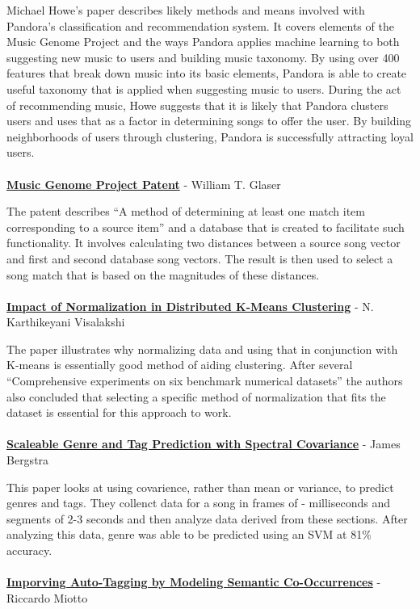 \documentclass[12pt]{article}
\begin{document}
Michael Howe's paper describes likely methods and means involved with Pandora's classification and recommendation system. It covers elements of the Music Genome Project and the ways Pandora applies machine learning to both suggesting new music to users and building music taxonomy. By using over 400 features that break down music into its basic elements, Pandora is able to create useful taxonomy that is applied when suggesting music to users. During the act of recommending music, Howe suggests that it is likely that Pandora clusters users and uses that as a factor in determining songs to offer the user. By building neighborhoods of users through clustering, Pandora is successfully attracting loyal users.
\\
\\
\href{http://www.google.com/patents/US7003515?dq=7,003,515}{\textbf{Music Genome Project Patent}} - William T. Glaser 

The patent describes  ``A method of determining at least one match item corresponding to a source item'' and a database that is created to facilitate such functionality. It involves calculating two distances between a source song vector and  first and second database song vectors. The result is then used to select a song match that is based on the magnitudes of these distances.
\\
\\
\href{http://www.medwelljournals.com/fulltext/?doi=ijscomp.2009.168.172}{\textbf{Impact of Normalization in Distributed K-Means Clustering}} - N. Karthikeyani Visalakshi 

The paper illustrates why normalizing data and using that in conjunction with K-means is essentially good method of aiding clustering. After several ``Comprehensive experiments on six benchmark numerical datasets'' the authors also concluded that selecting a specific method of normalization that fits the dataset is essential for this approach to work.
\\
\\
\href{http://ismir2010.ismir.net/proceedings/ismir2010-86.pdf}{\textbf{Scaleable Genre and Tag Prediction with Spectral Covariance}} - James Bergstra
 
This paper looks at using covarience, rather than mean or variance, to predict genres and tags. They collenct data for a song in frames of 
- milliseconds and segments of 2-3 seconds and then analyze data derived from these sections. After analyzing this data, genre was able to be predicted using an SVM at 81\% accuracy.
\\
\\
\href{http://ismir2010.ismir.net/proceedings/ismir2010-86.pdf}{\textbf{Imporving Auto-Tagging by Modeling Semantic Co-Occurrences}} - Riccardo Miotto
\end{document}
